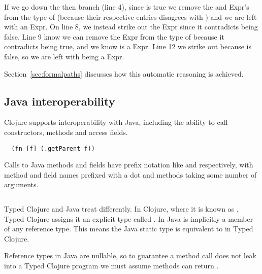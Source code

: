 \begin{exmp}
\inputminted[linenos,firstnumber=1,firstline=15,lastline=27]{clojure}{code/demo/src/demo/hmap.clj}
\label{example:decmap}
\end{exmp}

If we go down the then branch (line 4), since  is true
we remove
the  and 
Expr's from the type of  (because their respective  entries disagrees with )
and we are left with an  Expr.
On line 8,
we instead strike out the  Expr since it contradicts  being false. 
Line 9 know we can
remove the  Expr from the type of  because it contradicts  being true,
and we know  is a  Expr.
Line 12 we strike out  because  is false,
so we are left with  being a  Expr.

Section~\ref{sec:formalpaths} discusses how this automatic reasoning is achieved.

\subsection{Java interoperability}
\label{sec:overviewjavainterop}

Clojure supports interoperability with Java, including the ability to
call constructors, methods and access fields.

\begin{verbatim}
  (fn [f] (.getParent f))
\end{verbatim}

Calls to Java methods and fields have prefix notation
like  and  respectively,
with method and field names prefixed with a dot and methods taking some number of arguments.

\begin{exmp}
\inputminted[firstline=18,lastline=19]{clojure}{code/demo/src/demo/parent3.clj}
\end{exmp}

Typed Clojure and Java treat  differently.
In Clojure, where it is known as , Typed Clojure assigns it an explicit type
called . In Java  is implicitly a member of any reference type.
This means the Java static type  is equivalent to
 in Typed Clojure.

Reference types in Java are nullable, so to guarantee a method call does not
leak  into a Typed Clojure program we
must assume methods can return .


